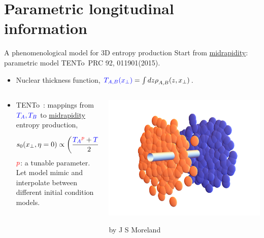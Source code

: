 \documentclass[11pt]{beamer}
\newcommand{\TRENTo}{T\raisebox{-0.2em}{R}ENTo~}
\begin{document}
\section{Parametric longitudinal information}
\begin{frame}{A phenomenological model for 3D entropy production}
Start from \underline{midrapidity}: parametric model \TRENTo {\tiny PRC 92, 011901(2015)}.
\begin{itemize}
\item Nuclear thickness function, ${\color{blue} T_{A, B}(x_\perp)} = \int dz \rho_{A, B}^{}(z, x_\perp)$.
\end{itemize}

\begin{columns}
\begin{column}{0.65\textwidth}
\begin{itemize}
\item \TRENTo: mappings from ${\color{blue} T_A, T_B}$ to \underline{midrapidity} entropy production,
\begin{eqnarray}
\nonumber
s_0(x_\perp, \eta=0) \propto \left(\frac{{\color{blue} T_A}^{\color{red} p} + {\color{blue} T_B}^{\color{red} p}}{2}\right)^{1/{\color{red} p}}.
\end{eqnarray}
${\color{red} p}$: a tunable parameter. Let model mimic and interpolate between different initial condition models.
\end{itemize}
\end{column}
\begin{column}{0.35\textwidth}
\includegraphics[width=\textwidth]{overlap_3.pdf}
\begin{center}
\tiny by J S Moreland
\end{center}
\end{column}
\end{columns}
\end{frame}
\end{document}
